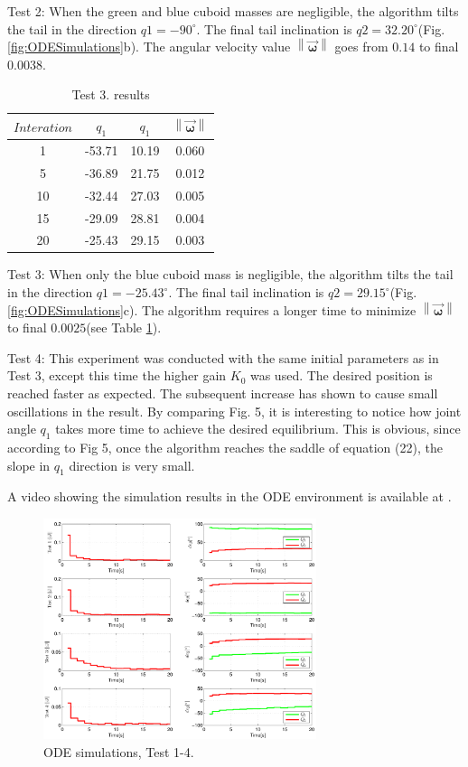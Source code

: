 Test 2: When the green and blue cuboid masses are negligible, the algorithm tilts the tail in the direction $q1=-90^{\circ}$. The final tail inclination is $q2=32.20^{\circ}$(Fig. \ref{fig:ODESimulations}b). The angular velocity value $\left \| \vec{\boldsymbol{\omega}} \right \|$ goes from $0.14$ to final $0.0038$. 

\begin{table}[!t]
	\centering
\begin{tabular}{|c|c|c|c|}
	\hline
$Interation$ & $q_1$ & $q_1$  & $\left \| \vec{\boldsymbol{\omega}} \right \|$\\
	\hline
1 & -53.71 & 10.19 & 0.060\\
5 & -36.89 & 21.75 & 0.012\\
10 & -32.44 & 27.03 &  0.005\\
15 & -29.09 & 28.81 & 0.004\\
20 & -25.43 & 29.15 &  0.003\\
\hline
\end{tabular}
\caption{Test 3. results}\label{tab:Simulations2}
\end{table}

Test 3: When only the blue cuboid mass is negligible, the algorithm tilts the tail in the direction $q1=-25.43^{\circ}$. The final tail inclination is $q2=29.15^{\circ}$(Fig. \ref{fig:ODESimulations}c). The algorithm requires a longer time to minimize $\left \| \vec{\boldsymbol{\omega}} \right \|$ to final $0.0025$(see Table \ref{tab:Simulations2}).



Test 4: This experiment was conducted with the same initial parameters as in Test 3, except this time the higher gain $K_0$ was used. The desired position is reached faster as expected. The subsequent increase has shown to cause small oscillations in the result. By comparing Fig. 5, it is interesting to notice how joint angle $q_1$ takes more time to achieve the desired equilibrium. This is obvious, since according to Fig 5, once the algorithm reaches the saddle of equation (22), the slope in $q_1$ direction is very small.

A video showing the simulation results in the ODE environment is available at \cite{IROS2013Movie}.


\begin{figure}[!t]
	\centering
	\includegraphics[width=80mm]{./pictures/ODE_graph.pdf}
	\caption{ODE simulations, Test 1-4.}
	\label{fig:ODE graph}
\end{figure}


